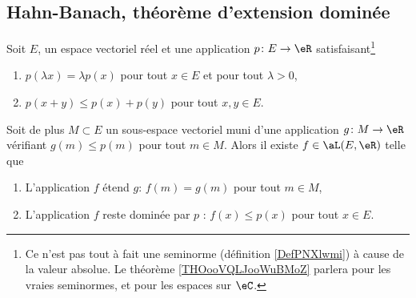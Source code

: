 \subsection{Hahn-Banach, théorème d'extension dominée}

\begin{theorem}		\label{THOooXALCooFrkvDo}
	Soit \( E\), un espace vectoriel réel et une application \( p\colon E\to \eR\) satisfaisant\footnote{Ce n'est pas tout à fait une seminorme (définition \ref{DefPNXlwmi}) à cause de la valeur absolue. Le théorème \ref{THOooVQLJooWuBMoZ} parlera pour les vraies seminormes, et pour les espaces sur \( \eC\).}
	\begin{enumerate}
		\item
		      \( p(\lambda x)=\lambda p(x)\) pour tout \( x\in E\) et pour tout \( \lambda>0\),
		\item
		      \( p(x+y)\leq p(x)+p(y)\) pour tout \( x,y\in E\).
	\end{enumerate}
	Soit de plus \( M\subset E\) un sous-espace vectoriel muni d'une application \( g\colon M\to \eR\) vérifiant \( g(m)\leq p(m)\) pour tout \( m\in M\). Alors il existe \( f\in\aL(E,\eR)\) telle que
	\begin{enumerate}
		\item
		      L'application \( f\) étend \( g\): \( f(m)=g(m)\) pour tout \( m\in M\),
		\item
		      L'application \( f\) reste dominée par \( p\) : \( f(x)\leq p(x)\) pour tout \( x\in E\).
	\end{enumerate}
\end{theorem}

